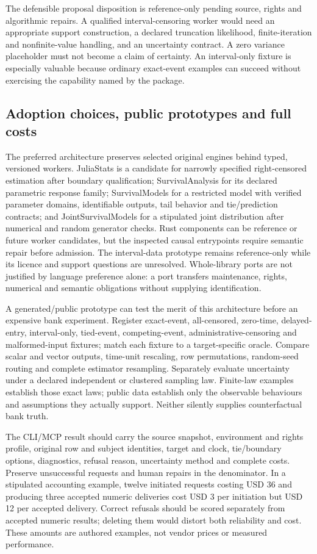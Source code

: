 The defensible proposal disposition is reference-only pending source, rights and
algorithmic repairs. A qualified interval-censoring worker would need an appropriate
support construction, a declared truncation likelihood, finite-iteration and
nonfinite-value handling, and an uncertainty contract. A zero variance placeholder
must not become a claim of certainty. An interval-only fixture is especially valuable
because ordinary exact-event examples can succeed without exercising the capability
named by the package.

\subsection{Adoption choices, public prototypes and full costs}
The preferred architecture preserves selected original engines behind typed,
versioned workers. JuliaStats is a candidate for narrowly specified right-censored
estimation after boundary qualification; SurvivalAnalysis for its declared parametric
response family; SurvivalModels for a restricted model with verified parameter
domains, identifiable outputs, tail behavior and tie/prediction contracts; and
JointSurvivalModels for a stipulated joint distribution after numerical and random
generator checks. Rust components can be reference or future worker candidates,
but the inspected causal entrypoints require semantic repair before admission.
The interval-data prototype remains reference-only while its licence and support
questions are unresolved. Whole-library ports are not justified by language
preference alone: a port transfers maintenance, rights, numerical and semantic
obligations without supplying identification.

A generated/public prototype can test the merit of this architecture before an
expensive bank experiment. Register exact-event, all-censored, zero-time, delayed-entry,
interval-only, tied-event, competing-event, administrative-censoring and malformed-input
fixtures; match each fixture to a target-specific oracle. Compare scalar and vector
outputs, time-unit rescaling, row permutations, random-seed routing and complete
estimator resampling. Separately evaluate uncertainty under a declared independent
or clustered sampling law. Finite-law examples establish those exact laws; public
data establish only the observable behaviours and assumptions they actually support.
Neither silently supplies counterfactual bank truth.

The CLI/MCP result should carry the source snapshot, environment and rights profile,
original row and subject identities, target and clock, tie/boundary options, diagnostics,
refusal reason, uncertainty method and complete costs. Preserve unsuccessful requests
and human repairs in the denominator. In a stipulated accounting example, twelve
initiated requests costing USD 36 and producing three accepted numeric deliveries
cost USD 3 per initiation but USD 12 per accepted delivery. Correct refusals should
be scored separately from accepted numeric results; deleting them would distort
both reliability and cost. These amounts are authored examples, not vendor prices
or measured performance.~\citep{exec24_survivalother_reference}

